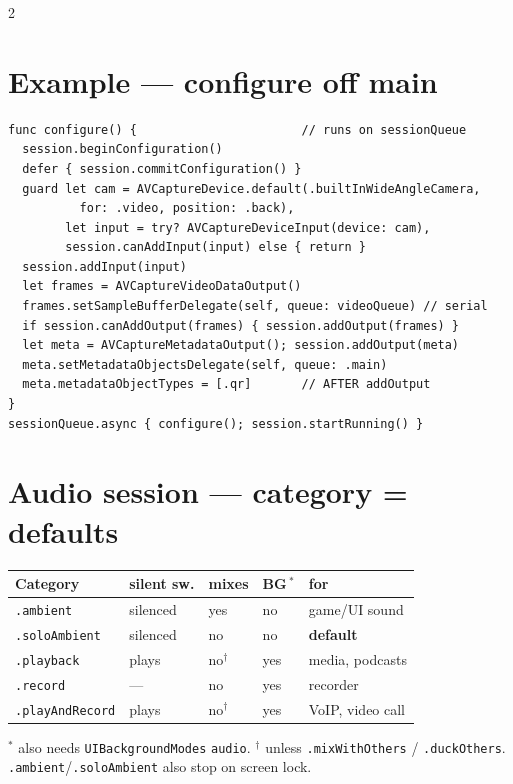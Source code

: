 \documentclass[8pt]{extarticle}
\begin{document}
\begin{multicols}{2}
\section{Example — configure off main}
\begin{lstlisting}[language=SwiftSheet]
func configure() {                       // runs on sessionQueue
  session.beginConfiguration()
  defer { session.commitConfiguration() }
  guard let cam = AVCaptureDevice.default(.builtInWideAngleCamera,
          for: .video, position: .back),
        let input = try? AVCaptureDeviceInput(device: cam),
        session.canAddInput(input) else { return }
  session.addInput(input)
  let frames = AVCaptureVideoDataOutput()
  frames.setSampleBufferDelegate(self, queue: videoQueue) // serial
  if session.canAddOutput(frames) { session.addOutput(frames) }
  let meta = AVCaptureMetadataOutput(); session.addOutput(meta)
  meta.setMetadataObjectsDelegate(self, queue: .main)
  meta.metadataObjectTypes = [.qr]       // AFTER addOutput
}
sessionQueue.async { configure(); session.startRunning() }
\end{lstlisting}

\columnbreak

\section{Audio session — category = defaults}
{\footnotesize
\begin{tabular}{@{}>{\raggedright\arraybackslash}p{19mm}>{\raggedright\arraybackslash}p{12mm}>{\raggedright\arraybackslash}p{11mm}>{\raggedright\arraybackslash}p{11mm}>{\raggedright\arraybackslash}p{19mm}@{}}
\toprule
\textbf{Category} & \textbf{silent sw.} & \textbf{mixes} & \textbf{BG\,$^*$} & \textbf{for} \\
\midrule
\texttt{.ambient} & silenced & yes & no & game/UI sound \\
\texttt{.soloAmbient} & silenced & no & no & \textbf{default} \\
\texttt{.playback} & plays & no$^\dagger$ & yes & media, podcasts \\
\texttt{.record} & — & no & yes & recorder \\
\texttt{.playAndRecord} & plays & no$^\dagger$ & yes & VoIP, video call \\
\bottomrule
\end{tabular}}\pdfonly{\\[1pt]}
{\scriptsize $^*$ also needs \texttt{UIBackgroundModes} \texttt{audio}. $^\dagger$ unless
\texttt{.mixWithOthers} / \texttt{.duckOthers}. \texttt{.ambient}/\texttt{.soloAmbient}
also stop on screen lock.}


\end{multicols}
\end{document}
